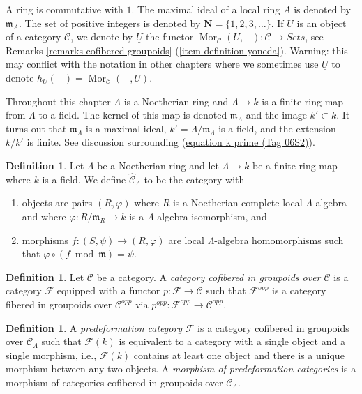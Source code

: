 \documentclass{amsart}
\theoremstyle{plain}
\theoremstyle{definition}
\newtheorem{definition}[subsection]{Definition}
\theoremstyle{remark}
\numberwithin{equation}{subsection}
\def\Mor{\mathop{\mathrm{Mor}}\nolimits}
\begin{document}
\noindent
A ring is commutative with $1$. The  maximal ideal of a local ring $A$
is denoted by $\mathfrak{m}_A$. The set of positive integers is denoted
by $\mathbf{N} = \{1, 2, 3, \ldots\}$. If $U$ is an object of a
category $\mathcal{C}$, we denote by $\underline{U}$
the functor
$\Mor_\mathcal{C}(U, -): \mathcal{C} \to \textit{Sets}$, see
Remarks \ref{remarks-cofibered-groupoids} (\ref{item-definition-yoneda}).
Warning: this may conflict with the notation in other chapters where we
sometimes use $\underline{U}$ to denote $h_U(-) = \Mor_\mathcal{C}(-, U)$.

\medskip\noindent
Throughout this chapter $\Lambda$ is a Noetherian ring and
$\Lambda \to k$ is a finite ring map from $\Lambda$ to a field.
The kernel of this map is denoted $\mathfrak m_\Lambda$ and the
image $k' \subset k$. It turns out that $\mathfrak m_\Lambda$ is
a maximal ideal, $k' = \Lambda/\mathfrak m_\Lambda$ is a field, and
the extension $k/k'$ is finite. See discussion surrounding
(\href{https://stacks.math.columbia.edu/tag/06S2}{equation k prime (Tag 06S2)}).




\begin{definition}
\label{definition-completion-CLambda}
Let $\Lambda$ be a Noetherian ring and let $\Lambda \to k$ be a finite
ring map where $k$ is a field. We define {\it $\widehat{\mathcal{C}}_\Lambda$}
to be the category with
\begin{enumerate}
\item objects are pairs $(R, \varphi)$ where $R$ is a Noetherian complete
local $\Lambda$-algebra and where $\varphi : R/\mathfrak m_R \to k$ is a
$\Lambda$-algebra isomorphism, and
\item morphisms $f : (S, \psi) \to (R, \varphi)$ are local $\Lambda$-algebra
homomorphisms such that $\varphi \circ (f \bmod \mathfrak m) = \psi$.
\end{enumerate}
\end{definition}

\begin{definition}
\label{definition-category-cofibred-groupoids}
Let $\mathcal{C}$ be a category.  A {\it category cofibered in groupoids over
$\mathcal{C}$} is a category $\mathcal{F}$ equipped with a functor
$p: \mathcal{F} \to \mathcal{C}$ such that $\mathcal{F}^{opp}$ is a category
fibered in groupoids over $\mathcal{C}^{opp}$ via
$p^{opp}: \mathcal{F}^{opp} \to \mathcal{C}^{opp}$.
\end{definition}

\begin{definition}
\label{definition-predeformation-category}
A {\it predeformation category} $\mathcal{F}$ is a category cofibered
in groupoids over $\mathcal{C}_\Lambda$ such that $\mathcal{F}(k)$ is
equivalent to a category with a single object and a single morphism,
i.e., $\mathcal{F}(k)$ contains at least one object and there is a
unique morphism between any two objects. A {\it morphism of predeformation
categories} is a morphism of categories cofibered in groupoids over
$\mathcal{C}_\Lambda$.
\end{definition}
\end{document}
